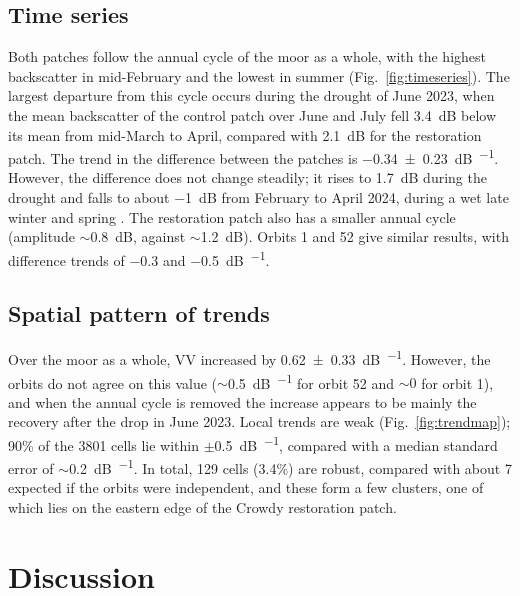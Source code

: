 \documentclass[10pt,a4paper,twocolumn]{article}
\begin{document}
\subsection{Time series}
Both patches follow the annual cycle of the moor as a whole, with the highest backscatter in mid-February and the lowest in summer (Fig.~\ref{fig:timeseries}).
The largest departure from this cycle occurs during the drought of June 2023, when the mean backscatter of the control patch over June and July fell \SI{3.4}{\deci\bel} below its mean from mid-March to April, compared with \SI{2.1}{\deci\bel} for the restoration patch.
The trend in the difference between the patches is \SI{-0.34 \pm 0.23}{\deci\bel\per\year}.
However, the difference does not change steadily; it rises to \SI{+1.7}{\deci\bel} during the drought and falls to about \SI{-1}{\deci\bel} from February to April 2024, during a wet late winter and spring \cite{metoffice}.
The restoration patch also has a smaller annual cycle (amplitude $\sim$\SI{0.8}{\deci\bel}, against $\sim$\SI{1.2}{\deci\bel}).
Orbits 1 and 52 give similar results, with difference trends of \SI{-0.3}{} and \SI{-0.5}{\deci\bel\per\year}.

\subsection{Spatial pattern of trends}
Over the moor as a whole, VV increased by \SI{+0.62 \pm 0.33}{\deci\bel\per\year}.
However, the orbits do not agree on this value ($\sim$\SI{0.5}{\deci\bel\per\year} for orbit 52 and $\sim 0$ for orbit 1), and when the annual cycle is removed the increase appears to be mainly the recovery after the drop in June 2023.
Local trends are weak (Fig.~\ref{fig:trendmap}); 90\% of the 3801 cells lie within $\pm$\SI{0.5}{\deci\bel\per\year}, compared with a median standard error of $\sim$\SI{0.2}{\deci\bel\per\year}.
In total, 129 cells (3.4\%) are robust, compared with about 7 expected if the orbits were independent, and these form a few clusters, one of which lies on the eastern edge of the Crowdy restoration patch.

\section{Discussion}
\end{document}
